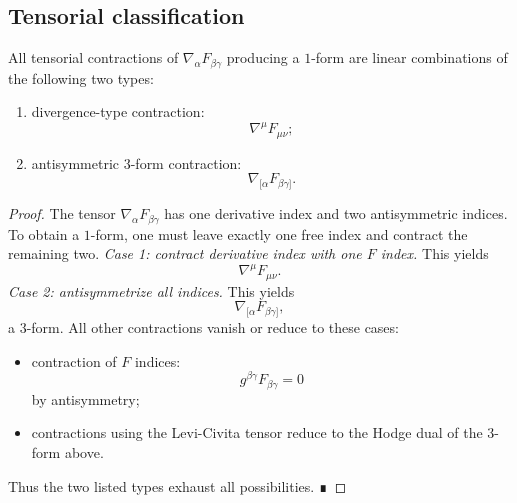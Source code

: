 \subsection{Tensorial classification}
\begin{lemma}
	\label{lem:em-operator-contractions}
	All tensorial contractions of $\nabla_\alpha F_{\beta\gamma}$ producing
	a $1$-form are linear combinations of the following two types:
	\begin{enumerate}
		\item divergence-type contraction:
		      \[
			      \nabla^\mu F_{\mu\nu};
		      \]
		\item antisymmetric $3$-form contraction:
		      \[
			      \nabla_{[\alpha}F_{\beta\gamma]}.
		      \]
	\end{enumerate}
\end{lemma}
\begin{proof}
	The tensor $\nabla_\alpha F_{\beta\gamma}$ has one derivative index and
	two antisymmetric indices.
	To obtain a $1$-form, one must leave exactly one free index and contract
	the remaining two.
	\medskip
	\noindent\emph{Case 1: contract derivative index with one $F$ index.}
	This yields
	\[
		\nabla^\mu F_{\mu\nu}.
	\]
	\medskip
	\noindent\emph{Case 2: antisymmetrize all indices.}
	This yields
	\[
		\nabla_{[\alpha}F_{\beta\gamma]},
	\]
	a $3$-form.
	\medskip
	All other contractions vanish or reduce to these cases:
	\begin{itemize}
		\item contraction of $F$ indices:
		      \[
			      g^{\beta\gamma}F_{\beta\gamma}=0
		      \]
		      by antisymmetry;
		\item contractions using the Levi-Civita tensor reduce to the Hodge
		      dual of the $3$-form above.
	\end{itemize}
	Thus the two listed types exhaust all possibilities. ∎
\end{proof}
